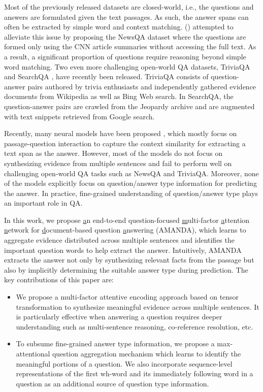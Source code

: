 \documentclass[letterpaper]{article}
\begin{document}
Most of the previously released datasets are closed-world, i.e., the questions and answers are formulated given the text passages. As such, the answer spans can often be extracted by simple word and context matching. \citeauthor{newsqa} (\citeyear{newsqa}) attempted to alleviate this issue by proposing the NewsQA dataset where the questions are formed only using the CNN article summaries without accessing the full text. As a result, a significant proportion of questions require reasoning beyond simple word matching.
Two even more challenging open-world QA datasets, TriviaQA \cite{triviaqa} and SearchQA \cite{searchqa}, have recently been released.
TriviaQA consists of question-answer pairs authored by trivia enthusiasts and independently gathered evidence documents from Wikipedia as well as Bing Web search.
In SearchQA, the question-answer pairs are crawled from the Jeopardy archive and are augmented with text snippets retrieved from Google search.

Recently, many neural models have been proposed \cite{mpcm_squad,memen,allenai_squad,smu_squad,fastqa_squad,salesforce_squad,cmu_squad}, which mostly focus on passage-question interaction to capture the context similarity for extracting a text span as the answer.
However, most of the models do not focus on synthesizing evidence from multiple sentences and fail to perform well on challenging open-world QA tasks such as NewsQA and TriviaQA.
Moreover, none of the models explicitly focus on question/answer type information for predicting the answer. In practice, fine-grained understanding of question/answer type plays an important role in QA.

In this work, we propose \underline{a}n end-to-end question-focused \underline{m}ulti-factor \underline{a}ttention \underline{n}etwork for \underline{d}ocument-based question \underline{a}nswering (AMANDA), which learns to aggregate evidence distributed across multiple sentences and identifies the important question words to help extract the answer.
Intuitively, AMANDA extracts the answer not only by synthesizing relevant facts from the passage but also by implicitly determining the suitable answer type during prediction.
The key contributions of this paper are:
\begin{itemize}
\item We propose a multi-factor attentive encoding approach based on tensor transformation to synthesize meaningful evidence across multiple sentences. It is particularly effective when answering a question requires deeper understanding such as multi-sentence reasoning, co-reference resolution, etc.
\item To subsume fine-grained answer type information, we propose a max-attentional question aggregation mechanism which learns to identify the meaningful portions of a question. We also incorporate sequence-level representations of the first wh-word and its immediately following word in a question as an additional source of question type information.


\end{itemize}
\end{document}

